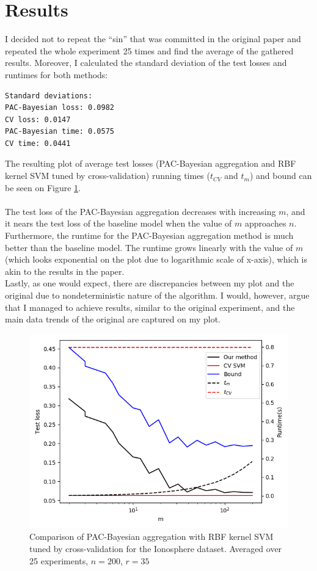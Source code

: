 \documentclass[a4paper]{article}
\begin{document}
\section{Results}
I decided not to repeat the ``sin'' that was committed in the original paper and
repeated the whole experiment 25 times and find the average of the gathered
results. Moreover, I calculated the standard deviation of the test losses and
runtimes for both methods:

\begin{verbatim}
Standard deviations:
PAC-Bayesian loss: 0.0982
CV loss: 0.0147
PAC-Bayesian time: 0.0575
CV time: 0.0441
\end{verbatim}
The resulting plot of average test losses (PAC-Bayesian aggregation and RBF
kernel SVM tuned by cross-validation) running times ($t_{CV}$ and $t_m$) and
bound can be seen on Figure \ref{plt1}. \\\\
The test loss of the PAC-Bayesian aggregation decreases with increasing
$m$, and it nears the test loss of the baseline model when the value of $m$
approaches $n$. \\
Furthermore, the runtime for the PAC-Bayesian aggregation method
is much better than the baseline model. The runtime grows linearly with the
value of $m$ (which looks exponential on the plot due to logarithmic scale of
x-axis), which is akin to the results in the paper. \\
Lastly, as one would expect, there are discrepancies between my plot and the
original due to nondeterministic nature of the algorithm. I would, however, argue
that I managed to achieve results, similar to the original experiment, and
the main data trends of the original are captured on my plot.

\newpage
\vspace*{\fill}
\begin{figure}[H]
  \centering
  \includegraphics[width=\textwidth]{code/plt_avg25_1}
  \caption{Comparison of PAC-Bayesian aggregation with RBF kernel SVM
    tuned by cross-validation for the Ionosphere dataset. Averaged over 25 experiments, $n=200$, $r=35$}
  \label{plt1}
\end{figure}
\vspace*{\fill}
\end{document}
